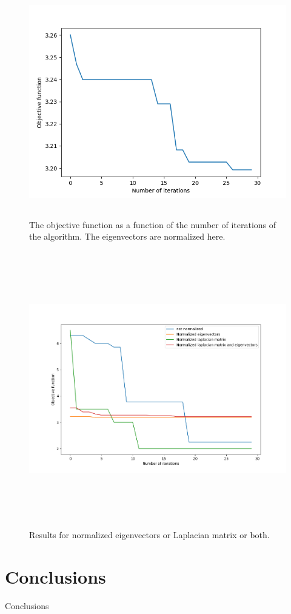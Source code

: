 \documentclass{article}
\begin{document}
\begin{figure}[htb]
\begin{center}
\includegraphics[height=10cm]{plot2.png}
\end{center}
\caption{The objective function as a function of the number of iterations of the algorithm. The eigenvectors are normalized here.}
\end{figure}

\begin{figure}[htb]
\begin{center}
\includegraphics[height=12cm]{normalization_plot.png}
\end{center}
\caption{Results for normalized eigenvectors or Laplacian matrix or both.}
\end{figure}

\section{Conclusions}

Conclusions
\end{document}
